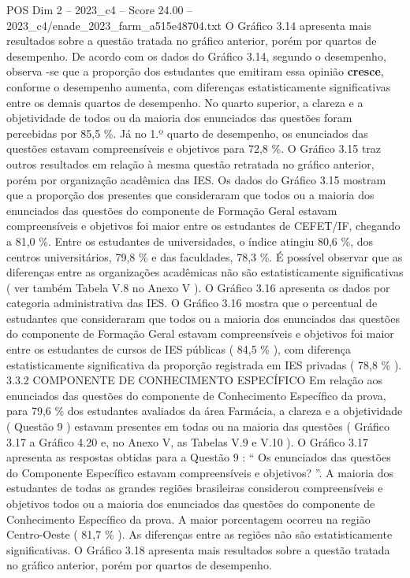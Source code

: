 \begin{textsample}{POS Dim 2 – 2023\_c4 – Score 24.00 – 2023\_c4/enade\_2023\_farm\_a515e48704.txt}
O Gráfico 3.14 apresenta mais resultados sobre a questão tratada no gráfico anterior, porém por quartos de desempenho.
De acordo com os dados do Gráfico 3.14, segundo o desempenho, observa -se que a proporção dos estudantes que emitiram essa opinião \textbf{cresce}, conforme o desempenho aumenta, com diferenças estatisticamente significativas entre os demais quartos de desempenho.
No quarto superior, a clareza e a objetividade de todos ou da maioria dos enunciados das questões foram percebidas por 85,5 \%.
Já no 1.º quarto de desempenho, os enunciados das questões estavam compreensíveis e objetivos para 72,8 \%.
O Gráfico 3.15 traz outros resultados em relação à mesma questão retratada no gráfico anterior, porém por organização acadêmica das IES.
Os dados do Gráfico 3.15 mostram que a proporção dos presentes que consideraram que todos ou a maioria dos enunciados das questões do componente de Formação Geral estavam compreensíveis e objetivos foi maior entre os estudantes de CEFET/IF, chegando a 81,0 \%.
Entre os estudantes de universidades, o índice atingiu 80,6 \%, dos centros universitários, 79,8 \% e das faculdades, 78,3 \%.
É possível observar que as diferenças entre as organizações acadêmicas não são estatisticamente significativas ( ver também Tabela V.8 no Anexo V ).
O Gráfico 3.16 apresenta os dados por categoria administrativa das IES.
O Gráfico 3.16 mostra que o percentual de estudantes que consideraram que todos ou a maioria dos enunciados das questões do componente de Formação Geral estavam compreensíveis e objetivos foi maior entre os estudantes de cursos de IES públicas ( 84,5 \% ), com diferença estatisticamente significativa da proporção registrada em IES privadas ( 78,8 \% ). 3.3.2 COMPONENTE DE CONHECIMENTO ESPECÍFICO Em relação aos enunciados das questões do componente de Conhecimento Específico da prova, para 79,6 \% dos estudantes avaliados da área Farmácia, a clareza e a objetividade ( Questão 9 ) estavam presentes em todas ou na maioria das questões ( Gráfico 3.17 a Gráfico 4.20 e, no Anexo V, as Tabelas V.9 e V.10 ).
O Gráfico 3.17 apresenta as respostas obtidas para a Questão 9 : “ Os enunciados das questões do Componente Específico estavam compreensíveis e objetivos? ”.
A maioria dos estudantes de todas as grandes regiões brasileiras considerou compreensíveis e objetivos todos ou a maioria dos enunciados das questões do componente de Conhecimento Específico da prova.
A maior porcentagem ocorreu na região Centro-Oeste ( 81,7 \% ).
As diferenças entre as regiões não são estatisticamente significativas.
O Gráfico 3.18 apresenta mais resultados sobre a questão tratada no gráfico anterior, porém por quartos de desempenho.

\end{textsample}
